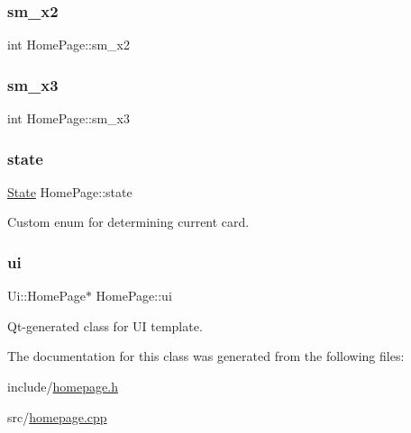 \subsubsection{\texorpdfstring{sm\_x2}{sm\_x2}}
{\footnotesize\ttfamily int Home\+Page\+::sm\+\_\+x2\hspace{0.3cm}{\ttfamily [private]}}

\mbox{\label{classHomePage_abd248b510f44173183825ee3f05f2604}} 
\subsubsection{\texorpdfstring{sm\_x3}{sm\_x3}}
{\footnotesize\ttfamily int Home\+Page\+::sm\+\_\+x3\hspace{0.3cm}{\ttfamily [private]}}

\mbox{\label{classHomePage_a99cf5c5d03a03747ea209a27555f5687}} 
\subsubsection{\texorpdfstring{state}{state}}
{\footnotesize\ttfamily \mbox{\hyperlink{datatypes_8h_a5d74787dedbc4e11c1ab15bf487e61f8}{State}} Home\+Page\+::state\hspace{0.3cm}{\ttfamily [private]}}



Custom enum for determining current card. 

\mbox{\label{classHomePage_ae5f1197f0c3aa11acf90d036ae4f91c7}} 
\subsubsection{\texorpdfstring{ui}{ui}}
{\footnotesize\ttfamily Ui\+::\+Home\+Page$\ast$ Home\+Page\+::ui\hspace{0.3cm}{\ttfamily [private]}}



Qt-\/generated class for UI template. 



The documentation for this class was generated from the following files\+:\begin{DoxyCompactItemize}
\item 
include/\mbox{\hyperlink{homepage_8h}{homepage.\+h}}\item 
src/\mbox{\hyperlink{homepage_8cpp}{homepage.\+cpp}}\end{DoxyCompactItemize}
